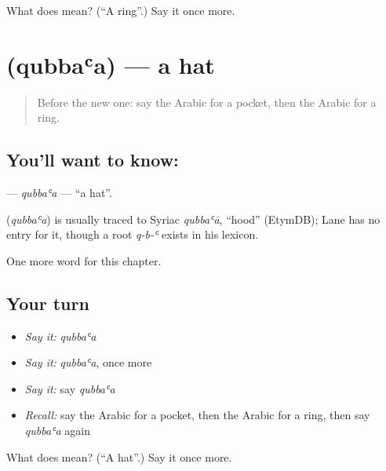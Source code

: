 \begin{tcolorbox}[breakable,colback=teal!4,colframe=teal!35!black,title={Before you move on}]
What does  mean? (\textquotedblleft{}A ring\textquotedblright{}.) Say it once more.
\end{tcolorbox}
\section[\texorpdfstring{\ar{قبعة} (qubbaʿa)}{قبعة (qubbaʿa)}]{ (qubbaʿa) — a hat}

\label{lesson:AR-C95-qubbaa}



\begin{quote}
Before the new one: say the Arabic for a pocket, then the Arabic for a ring.
\end{quote}

\subsection*{You'll want to know: }
\textbf{} — \emph{qubbaʿa} — \textquotedblleft{}a hat\textquotedblright{}.

\begin{cousinweb}
\textbf{} (\emph{qubbaʿa}) is usually traced to Syriac \emph{qubbaʿā}, \textquotedblleft{}hood\textquotedblright{} (EtymDB); Lane has no entry for it, though a root \emph{q-b-ʿ} exists in his lexicon.
\end{cousinweb}

\begin{grammarlens}[title={What you've built}]
One more word for this chapter.
\end{grammarlens}

\subsection*{Your turn}
\begin{itemize}
\raggedright
  \item \emph{Say it:} \emph{qubbaʿa}
  \item \emph{Say it:} \emph{qubbaʿa}, once more
  \item \emph{Say it:} say \emph{qubbaʿa}
  \item \emph{Recall:} say the Arabic for a pocket, then the Arabic for a ring, then say \emph{qubbaʿa} again
\end{itemize}

\begin{tcolorbox}[breakable,colback=teal!4,colframe=teal!35!black,title={Before you move on}]
What does  mean? (\textquotedblleft{}A hat\textquotedblright{}.) Say it once more.
\end{tcolorbox}
